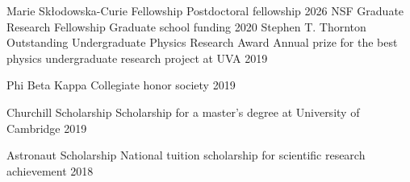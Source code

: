 



\begin{cvhonors}
  \cvhonor
    {Marie Skłodowska-Curie Fellowship} %
    {Postdoctoral fellowship} %
    {} %
    {2026} %
  \cvhonor
    {NSF Graduate Research Fellowship} %
    {Graduate school funding} %
    {} %
    {2020} %
  \cvhonor
    {Stephen T. Thornton Outstanding Undergraduate Physics Research Award} %
    {Annual prize for the best physics undergraduate research project at UVA} %
    {} %
    {2019} %

  \cvhonor
    {Phi Beta Kappa} %
    {Collegiate honor society} %
    {} %
    {2019} %

  \cvhonor
    {Churchill Scholarship} %
    {Scholarship for a master’s degree at University of Cambridge} %
    {} %
    {2019} %
    
  \cvhonor
    {Astronaut Scholarship} %
    {National tuition scholarship for scientific research achievement} %
    {} %
    {2018} %
    
    

\end{cvhonors}
